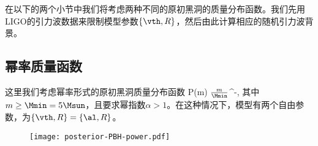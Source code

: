 在以下的两个小节中我们将考虑两种不同的原初黑洞的质量分布函数。我们先用LIGO的引力波数据来限制模型参数$\{\vth, R\}$，然后由此计算相应的随机引力波背景。

\subsection{幂率质量函数}
这里我们考虑幂率形式的原初黑洞质量分布函数\citep{Carr:1975qj}
\e\label{power}
P(m)\approx {\alpha-1\over \Mmin} \({m\over \Mmin}\)^{-\alpha},
\q
其中$m\geq \Mmin = 5\Msun$，且要求幂指数$\alpha>1$。在这种情况下，模型有两个自由参数，为$\{\vth, R\} = \{\al, R\}$。

\begin{figure}[htb!]
    \centering
    \texttt{[image: posterior-PBH-power.pdf]}
\end{figure}

